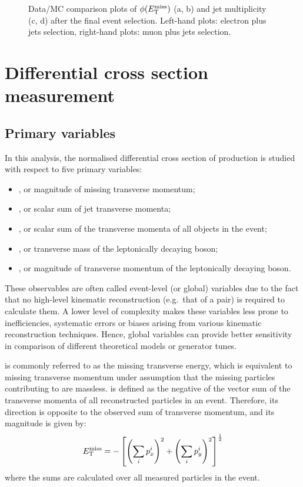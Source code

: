 \begin{figure}[htbp]
    \caption{Data/MC comparison plots of $\phi(E_{\mathrm{T}}^{\textrm{miss}})$ (a, b) and jet multiplicity (c, d) after the final event
    selection. Left-hand plots: electron plus jets selection, right-hand plots: muon plus jets selection.}
    \label{fig:contol_plots_phiMET_NJets}
\end{figure}

\newpage

\section{Differential cross section measurement}
\label{s_xsection:measurement}

\subsection{Primary variables}
\label{ss_xsection:variables}

In this analysis, the normalised differential cross section of \ttbar production is studied with respect to five primary
variables:

\begin{itemize}
	\item \MET, or magnitude of missing transverse momentum;
	\item \HT, or scalar sum of jet transverse momenta;
	\item \ST, or scalar sum of the transverse momenta of all objects in the event;
	\item \MT, or transverse mass of the leptonically decaying \W boson;
	\item \WPT, or magnitude of transverse momentum of the leptonically decaying \W boson.
\end{itemize}

These observables are often called event-level (or global) variables due to the fact that no high-level kinematic
reconstruction (e.g.\ that of a \ttbar pair) is required to calculate them. A lower level of complexity makes these
variables less prone to inefficiencies, systematic errors or biases arising from various kinematic reconstruction
techniques. Hence, global variables can provide better sensitivity in comparison of different theoretical models or
generator tunes.

\METvec is commonly referred to as the missing transverse energy, which is equivalent to missing transverse momentum
under assumption that the missing particles contributing to \METvec are massless. \METvec is defined as the negative of
the vector sum of the transverse momenta of all reconstructed particles in an event. Therefore, its direction is
opposite to the observed sum of transverse momentum, and its magnitude \MET is given by:
\[ E_{\mathrm{T}}^{\textrm{miss}} = - \left[ \left(\sum_i{p_{x}^i}\right)^2 + \left(\sum_i{p_{y}^i}\right)^2 \right]^{\frac{1}{2}}\]
where the sums are calculated over all measured particles in the event.

